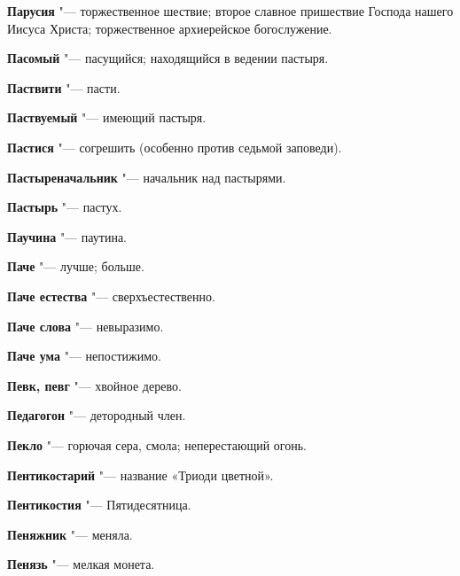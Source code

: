 \begin{mymulticols}{2}
\noindent\textbf{Парусия} "--- торжественное шествие; второе славное пришествие Господа нашего Иисуса Христа; торжественное архиерейское богослужение. 




\noindent\textbf{Пасомый} "--- пасущийся; находящийся в ведении пастыря. 




\noindent\textbf{Паствити} "--- пасти. 




\noindent\textbf{Паствуемый} "--- имеющий пастыря. 




\noindent\textbf{Пастися} "--- согрешить (особенно против седьмой заповеди). 




\noindent\textbf{Пастыреначальник} "--- начальник над пастырями. 




\noindent\textbf{Пастырь} "--- пастух. 




\noindent\textbf{Паучина} "--- паутина. 




\noindent\textbf{Паче} "--- лучше; больше. 




\noindent\textbf{Паче естества} "--- сверхъестественно. 




\noindent\textbf{Паче слова} "--- невыразимо. 




\noindent\textbf{Паче ума} "--- непостижимо. 




\noindent\textbf{Певк, певг} "--- хвойное дерево. 




\noindent\textbf{Педагогон} "--- детородный член. 




\noindent\textbf{Пекло} "--- горючая сера, смола; неперестающий огонь. 




\noindent\textbf{Пентикостарий} "--- название «Триоди цветной». 




\noindent\textbf{Пентикостия} "--- Пятидесятница. 




\noindent\textbf{Пеняжник} "--- меняла. 




\noindent\textbf{Пенязь} "--- мелкая монета. 





\end{mymulticols}
